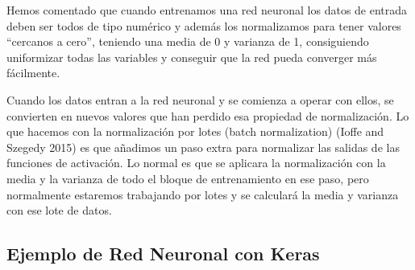 \documentclass[
  a4paper,
  DIV=11,
  numbers=noendperiod]{scrreprt}
\begin{document}
Hemos comentado que cuando entrenamos una red neuronal los datos de
entrada deben ser todos de tipo numérico y además los normalizamos para
tener valores ``cercanos a cero'', teniendo una media de 0 y varianza de
1, consiguiendo uniformizar todas las variables y conseguir que la red
pueda converger más fácilmente.

Cuando los datos entran a la red neuronal y se comienza a operar con
ellos, se convierten en nuevos valores que han perdido esa propiedad de
normalización. Lo que hacemos con la normalización por lotes (batch
normalization) (Ioffe and Szegedy 2015) es que añadimos un paso extra
para normalizar las salidas de las funciones de activación. Lo normal es
que se aplicara la normalización con la media y la varianza de todo el
bloque de entrenamiento en ese paso, pero normalmente estaremos
trabajando por lotes y se calculará la media y varianza con ese lote de
datos.

\subsection{Ejemplo de Red Neuronal con
Keras}\label{ejemplo-de-red-neuronal-con-keras}
\end{document}
